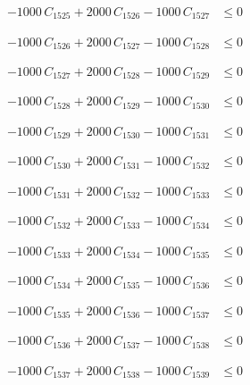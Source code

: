 \documentclass[a4paper,11pt]{article}
\begin{document}
\begin{align}
-1000\,C_{1525} + 2000\,C_{1526} - 1000\,C_{1527} &\leq 0 \nonumber
\end{align}

\begin{align}
-1000\,C_{1526} + 2000\,C_{1527} - 1000\,C_{1528} &\leq 0 \nonumber
\end{align}

\begin{align}
-1000\,C_{1527} + 2000\,C_{1528} - 1000\,C_{1529} &\leq 0 \nonumber
\end{align}

\begin{align}
-1000\,C_{1528} + 2000\,C_{1529} - 1000\,C_{1530} &\leq 0 \nonumber
\end{align}

\begin{align}
-1000\,C_{1529} + 2000\,C_{1530} - 1000\,C_{1531} &\leq 0 \nonumber
\end{align}

\begin{align}
-1000\,C_{1530} + 2000\,C_{1531} - 1000\,C_{1532} &\leq 0 \nonumber
\end{align}

\begin{align}
-1000\,C_{1531} + 2000\,C_{1532} - 1000\,C_{1533} &\leq 0 \nonumber
\end{align}

\begin{align}
-1000\,C_{1532} + 2000\,C_{1533} - 1000\,C_{1534} &\leq 0 \nonumber
\end{align}

\begin{align}
-1000\,C_{1533} + 2000\,C_{1534} - 1000\,C_{1535} &\leq 0 \nonumber
\end{align}

\begin{align}
-1000\,C_{1534} + 2000\,C_{1535} - 1000\,C_{1536} &\leq 0 \nonumber
\end{align}

\begin{align}
-1000\,C_{1535} + 2000\,C_{1536} - 1000\,C_{1537} &\leq 0 \nonumber
\end{align}

\begin{align}
-1000\,C_{1536} + 2000\,C_{1537} - 1000\,C_{1538} &\leq 0 \nonumber
\end{align}

\begin{align}
-1000\,C_{1537} + 2000\,C_{1538} - 1000\,C_{1539} &\leq 0 \nonumber
\end{align}
\end{document}
